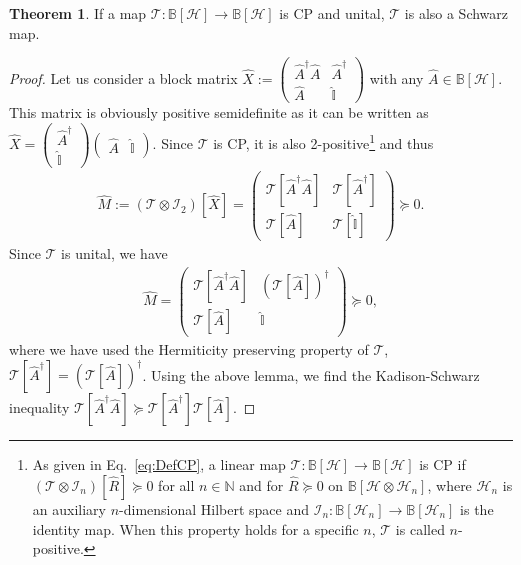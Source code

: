 \documentclass[preprint,pteplogo]{ptephy_v2}%
\numberwithin{equation}{section}
\theoremstyle{definition}
\newtheorem{theorem}{Theorem}
\newcommand{\mc}[1]{\mathcal{#1}}
\newcommand{\mbb}[1]{\mathbb{#1}}
\begin{document}
\begin{theorem}
If a map $\mc{T}: \mbb{B}[\mc{H}] \to \mbb{B}[\mc{H}]$ is CP and unital, $\mc{T}$ is also a Schwarz map.
\end{theorem}

\begin{proof}
Let us consider a block matrix $\hat{X} := \begin{pmatrix} \hat{A}^\dagger \hat{A} & \hat{A}^\dagger \\ \hat{A} & \hat{\mbb{I}} \end{pmatrix}$ with any $\hat{A} \in \mbb{B}[\mc{H}]$. 
This matrix is obviously positive semidefinite as it can be written as $\hat{X} = \begin{pmatrix} \hat{A}^\dagger \\ \hat{\mbb{I}} \end{pmatrix} \begin{pmatrix} \hat{A} & \hat{\mbb{I}} \end{pmatrix}$.
Since $\mc{T}$ is CP, it is also 2-positive\footnote{
As given in Eq.~\eqref{eq:DefCP}, a linear map $\mc{T}: \mbb{B}[\mc{H}] \to \mbb{B}[\mc{H}]$ is CP if $(\mc{T} \otimes \mc{I}_n)[\hat{R}] \succeq 0$ for all $n \in \mbb{N}$ and for $\hat{R} \succeq 0$ on $\mbb{B}[\mc{H} \otimes \mc{H}_n]$, where $\mc{H}_n$ is an auxiliary $n$-dimensional Hilbert space and $\mc{I}_n: \mbb{B}[\mc{H}_n] \to \mbb{B}[\mc{H}_n]$ is the identity map.
When this property holds for a specific $n$, $\mc{T}$ is called $n$-positive.
}
and thus 
\begin{align}
\hat{M} 
:= (\mc{T} \otimes \mc{I}_2)[\hat{X}] 
= \begin{pmatrix} \mc{T} [\hat{A}^\dagger \hat{A}] & \mc{T}[\hat{A}^\dagger] \\
\mc{T}[\hat{A}] & \mc{T}[\hat{\mbb{I}}] \end{pmatrix} 
\succeq 0.
\end{align}
Since $\mc{T}$ is unital, we have
\begin{align}
\hat{M} = \begin{pmatrix} \mc{T}[\hat{A}^\dagger \hat{A}] & (\mc{T}[\hat{A}])^\dagger \\ \mc{T}[\hat{A}] & \hat{\mbb{I}} \end{pmatrix} \succeq 0,
\end{align}
where we have used the Hermiticity preserving property of $\mc{T}$, $\mc{T}[\hat{A}^\dagger] = (\mc{T}[\hat{A}])^\dagger$.
Using the above lemma, we find the Kadison-Schwarz inequality $\mc{T}[\hat{A}^\dagger \hat{A}] \succeq \mc{T}[\hat{A}^\dagger] \mc{T}[\hat{A}]$.
\end{proof}
\end{document}
